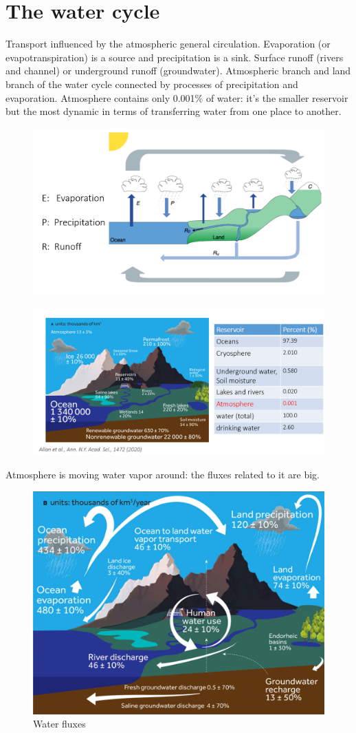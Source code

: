 \section{The water cycle}
Transport influenced by the atmospheric general circulation. Evaporation (or evapotranspiration) is a source and precipitation is a sink. Surface runoff (rivers and channel) or underground runoff (groundwater). Atmospheric branch and land branch of the water cycle connected by processes of precipitation and evaporation. Atmosphere contains only 0.001\% of water: it's the smaller reservoir but the most dynamic in terms of transferring water from one place to another.
\begin{figure}[htpb]
    \centering
    \includegraphics[width=0.5\linewidth]{uploads/water cycle.png}
\end{figure}
\begin{figure}[htpb]
    \centering
    \includegraphics[width=0.5\linewidth]{uploads/water content.png}
\end{figure}
Atmosphere is moving water vapor around: the fluxes related to it are big.
\begin{figure}[htpb]
    \centering
    \includegraphics[width=0.5\linewidth]{uploads/water fluxes.png}
    \caption{Water fluxes}
    \label{fig:water fluxes}
\end{figure}
